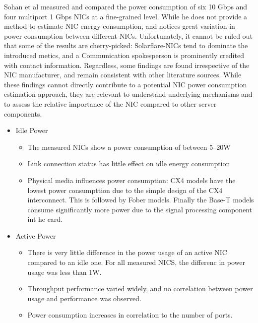 Sohan et al\parencite{sohanCharacterizing10Gbps2010} measured and compared the power consumption of six 10 Gbps and four multiport 1 Gbps NICs at a fine-grained level. While he does not provide a method to estimate NIC energy consumption, and notices great variation in power consumption between different NICs. Unfortunately, it cannot be ruled out that some of the results are cherry-picked: Solarflare-NICs tend to dominate the introduced metics, and a Communication spokesperson is prominently credited with contact information. Regardless, some findings are found irrespective of the NIC manufacturer, and remain consistent with other literature sources\parencite{gough2015energy}. While these findings cannot directly contribute to a potential NIC power consumption estimation approach, they are relevant to understand underlying mechanisms and to assess the relative importance of the NIC compared to other server components.
\begin{itemize}
    \item Idle Power
    \begin{itemize}
        \item The measured NICs show a power consumption of between 5--20W
        \item Link connection status has little effect on idle energy consumption
        \item Physical media influences power consumption: CX4 models have the lowest power consumpttion due to the simple design of the CX4 interconnect. This is followed by Fober models. Finally the Base-T models consume significantly more power due to the signal processing component int he card.
    \end{itemize}
    \item Active Power
    \begin{itemize}
        \item There is very little difference in the power usage of an active NIC compared to an idle one. For all measured NICS, the differenc in power usage was less than 1W.
        \item Throughput performance varied widely, and no correlation between power usage and performance was observed.
        \item Power consumption increases in correlation to the number of ports. 
    \end{itemize}
\end{itemize}

